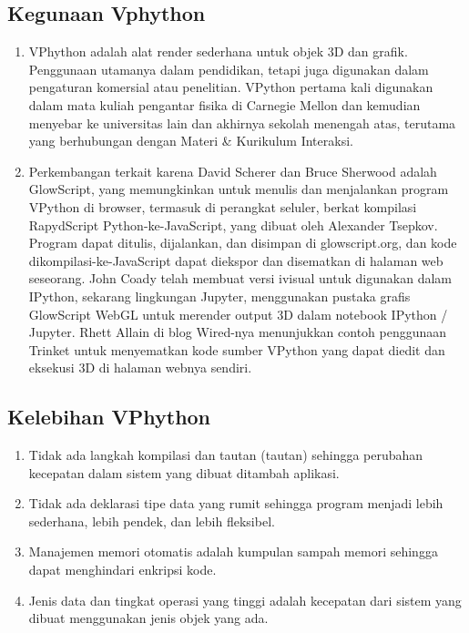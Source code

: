 \subsection{Kegunaan Vphython}
		\begin{enumerate}
			\item VPhython adalah alat render sederhana untuk objek 3D dan grafik. Penggunaan utamanya dalam pendidikan, tetapi juga digunakan dalam pengaturan komersial atau penelitian. VPython pertama kali digunakan dalam mata kuliah pengantar fisika di Carnegie Mellon dan kemudian menyebar ke universitas lain dan akhirnya sekolah menengah atas, terutama yang berhubungan dengan Materi & Kurikulum Interaksi.
			\item Perkembangan terkait karena David Scherer dan Bruce Sherwood adalah GlowScript, yang memungkinkan untuk menulis dan menjalankan program VPython di browser, termasuk di perangkat seluler, berkat kompilasi RapydScript Python-ke-JavaScript, yang dibuat oleh Alexander Tsepkov. Program dapat ditulis, dijalankan, dan disimpan di glowscript.org, dan kode dikompilasi-ke-JavaScript dapat diekspor dan disematkan di halaman web seseorang. John Coady telah membuat versi ivisual untuk digunakan dalam IPython, sekarang lingkungan Jupyter, menggunakan pustaka grafis GlowScript WebGL untuk merender output 3D dalam notebook IPython / Jupyter. Rhett Allain di blog Wired-nya menunjukkan contoh penggunaan Trinket untuk menyematkan kode sumber VPython yang dapat diedit dan eksekusi 3D di halaman webnya sendiri.
		\end{enumerate}
\subsection{Kelebihan VPhython}
		\begin{enumerate}
			\item Tidak ada langkah kompilasi dan tautan (tautan) sehingga perubahan kecepatan dalam sistem yang dibuat ditambah aplikasi.
			\item Tidak ada deklarasi tipe data yang rumit sehingga program menjadi lebih sederhana, lebih pendek, dan lebih fleksibel.
			\item Manajemen memori otomatis adalah kumpulan sampah memori sehingga dapat menghindari enkripsi kode.
			\item Jenis data dan tingkat operasi yang tinggi adalah kecepatan dari sistem yang dibuat menggunakan jenis objek yang ada.
		\end{enumerate}
